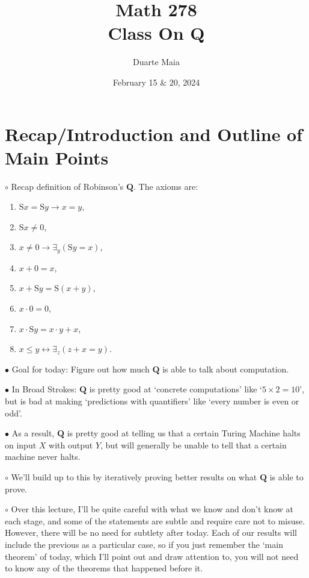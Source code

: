 \documentclass{article}
\title{Math 278\\Class On Q}
\author{Duarte Maia}
\date{February 15 \& 20, 2024}
\newcommand{\RQ}{\mathbf{Q}}
\newcommand{\suc}{\mathrm{S}}
\newcommand\Point[1]{\noindent \hspace{\labelsep} {\large $\bullet$ #1} \smallskip}
\newcommand\point[1]{\noindent \hspace{\labelsep} {\small $\circ$ #1} \smallskip}
\begin{document}
\maketitle

\section{Recap/Introduction and Outline of Main Points}

\point{Recap definition of Robinson's $\RQ$. The axioms are:
\begin{enumerate}[label=\arabic*., itemsep=0em, ref=\arabic*]
\item\label{ax:1} $\suc x = \suc y \rightarrow x=y$,
\item\label{ax:2} $\suc x \neq 0$,
\item\label{ax:3} $x \neq 0 \rightarrow \exists_y(\suc y = x)$,
\item\label{ax:4} $x+0 = x$,
\item\label{ax:5} $x + \suc y = \suc(x+y)$,
\item\label{ax:6} $x \cdot 0 = 0$,
\item\label{ax:7} $x \cdot \suc y = x\cdot y + x$,
\item\label{ax:8} $x \leq y \leftrightarrow \exists_z (z+x = y)$.
\end{enumerate}}

\Point{Goal for today: Figure out how much $\RQ$ is able to talk about computation.}

\Point{In Broad Strokes: $\RQ$ is pretty good at `concrete computations' like `$5 \times 2 = 10$', but is bad at making `predictions with quantifiers' like `every number is even or odd'.}

\Point{As a result, $\RQ$ is pretty good at telling us that a certain Turing Machine halts on input $X$ with output $Y$, but will generally be unable to tell that a certain machine never halts.}

\point{We'll build up to this by iteratively proving better results on what $\RQ$ is able to prove.}

\point{Over this lecture, I'll be quite careful with what we know and don't know at each stage, and some of the statements are subtle and require care not to misuse. However, there will be no need for subtlety after today. Each of our results will include the previous as a particular case, so if you just remember the `main theorem' of today, which I'll point out and draw attention to, you will not need to know any of the theorems that happened before it.}
\end{document}

